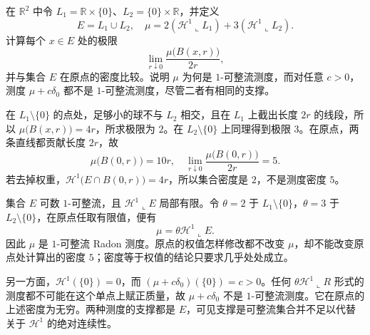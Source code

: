 \begin{exercise}\label{b1:ex:19-weighted-cross-and-atom}
在 \(\mathbb R^2\) 中令 \(L_1=\mathbb R\times\{0\}\)、\(L_2=\{0\}\times\mathbb R\)，并定义
\[
 E=L_1\cup L_2,
 \quad \mu=2(\mathcal H^1\llcorner L_1)+3(\mathcal H^1\llcorner L_2).
\]
计算每个 \(x\in E\) 处的极限
\[
 \lim_{r\downarrow0}\frac{\mu\bigl(B(x,r)\bigr)}{2r},
\]
并与集合 \(E\) 在原点的密度比较。说明 \(\mu\) 为何是 \(1\)-可整流测度，而对任意 \(c>0\)，测度 \(\mu+c\delta_0\) 都不是 \(1\)-可整流测度，尽管二者有相同的支撑。
\end{exercise}
\begin{solution}
在 \(L_1\setminus\{0\}\) 的点处，足够小的球不与 \(L_2\) 相交，且在 \(L_1\) 上截出长度 \(2r\) 的线段，所以 \(\mu\bigl(B(x,r)\bigr)=4r\)，所求极限为 \(2\)。在 \(L_2\setminus\{0\}\) 上同理得到极限 \(3\)。在原点，两条直线都贡献长度 \(2r\)，故
\[
 \mu\bigl(B(0,r)\bigr)=10r,
 \quad \lim_{r\downarrow0}\frac{\mu\bigl(B(0,r)\bigr)}{2r}=5.
\]
若去掉权重，\(\mathcal H^1\bigl(E\cap B(0,r)\bigr)=4r\)，所以集合密度是 \(2\)，不是测度密度 \(5\)。

集合 \(E\) 可数 \(1\)-可整流，且 \(\mathcal H^1\llcorner E\) 局部有限。令 \(\theta=2\) 于 \(L_1\setminus\{0\}\)，\(\theta=3\) 于 \(L_2\setminus\{0\}\)，在原点任取有限值，便有
\[
 \mu=\theta\mathcal H^1\llcorner E.
\]
因此 \(\mu\) 是 \(1\)-可整流 Radon 测度。原点的权值怎样修改都不改变 \(\mu\)，却不能改变原点处计算出的密度 \(5\)；密度等于权值的结论只要求几乎处处成立。

另一方面，\(\mathcal H^1(\{0\})=0\)，而 \((\mu+c\delta_0)(\{0\})=c>0\)。任何 \(\theta\mathcal H^1\llcorner R\) 形式的测度都不可能在这个单点上赋正质量，故 \(\mu+c\delta_0\) 不是 \(1\)-可整流测度。它在原点的上述密度为无穷。两种测度的支撑都是 \(E\)，可见支撑是可整流集合并不足以代替关于 \(\mathcal H^1\) 的绝对连续性。
\end{solution}

